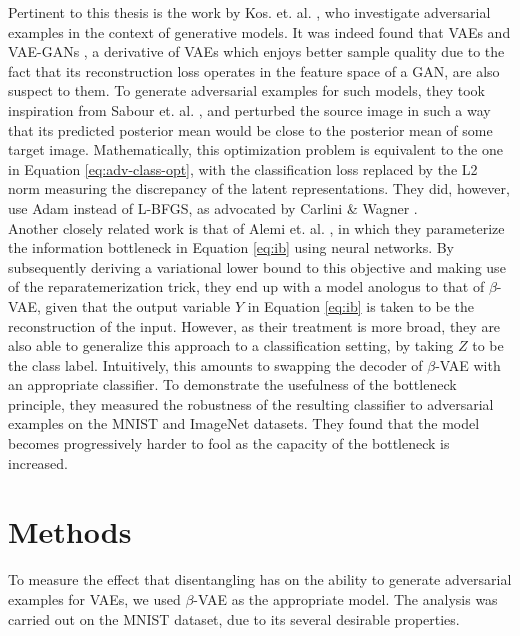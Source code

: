 \documentclass{report}
\begin{document}
\noindent Pertinent to this thesis is the work by Kos. et. al. \cite{kos-gen-adv}, who investigate adversarial examples in the context of generative models. It was indeed found that VAEs and VAE-GANs \cite{vaegan}, a derivative of VAEs which enjoys better sample quality due to the fact that its reconstruction loss operates in the feature space of a GAN, are also suspect to them. To generate adversarial examples for such models, they took inspiration from Sabour et. al. \cite{sabour}, and perturbed the source image in such a way that its predicted posterior mean would be close to the posterior mean of some target image. Mathematically, this optimization problem is equivalent to the one in Equation \ref{eq:adv-class-opt}, with the classification loss replaced by the L2 norm measuring the discrepancy of the latent representations. They did, however, use Adam instead of L-BFGS, as advocated by Carlini \& Wagner \cite{carlini-wagner-16}. \\

\noindent Another closely related work is that of Alemi et. al. \cite{deep-variational-bottleneck}, in which they parameterize the information bottleneck in Equation \ref{eq:ib} using neural networks. By subsequently deriving a variational lower bound to this objective and making use of the reparatemerization trick, they end up with a model anologus to that of $\beta$-VAE, given that the output variable $Y$ in Equation \ref{eq:ib} is taken to be the reconstruction of the input. However, as their treatment is more broad, they are also able to generalize this approach to a classification setting, by taking $Z$ to be the class label. Intuitively, this amounts to swapping the decoder of $\beta$-VAE with an appropriate classifier. To demonstrate the usefulness of the bottleneck principle, they measured the robustness of the resulting classifier to adversarial examples on the MNIST and ImageNet datasets. They found that the model becomes progressively harder to fool as the capacity of the bottleneck is increased.

\chapter{Methods}

\noindent To measure the effect that disentangling has on the ability to generate adversarial examples for VAEs, we used $\beta$-VAE as the appropriate model. The analysis was carried out on the MNIST dataset, due to its several desirable properties. \\
\end{document}
